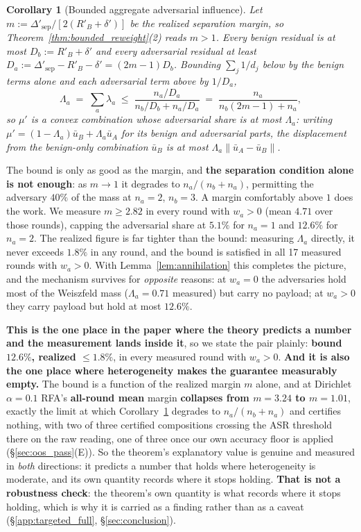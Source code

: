 \documentclass{article}
\newtheorem{corollary}{Corollary}
\begin{document}
\begin{corollary}[Bounded aggregate adversarial influence]
\label{cor:aggregate_mass}
Let $m := \Delta'_{\mathrm{sep}}/[2(R'_B+\delta')]$ be the realized separation margin, so Theorem~\ref{thm:bounded_reweight}(2) reads $m>1$. Every benign residual is at most $D_b := R'_B+\delta'$ and every adversarial residual at least $D_a := \Delta'_{\mathrm{sep}}-R'_B-\delta' = (2m-1)D_b$. Bounding $\sum_j 1/d_j$ below by the benign terms alone and each adversarial term above by $1/D_a$,
\[
\Lambda_a \;=\; \sum_{a}\lambda_a \;\leq\; \frac{n_a/D_a}{n_b/D_b + n_a/D_a} \;=\; \frac{n_a}{n_b(2m-1)+n_a},
\]
so $\mu'$ is a convex combination whose adversarial share is at most $\Lambda_a$: writing $\mu' = (1-\Lambda_a)\bar u_B + \Lambda_a \bar u_A$ for its benign and adversarial parts, the displacement from the benign-only combination $\bar u_B$ is at most $\Lambda_a\|\bar u_A - \bar u_B\|$.
\end{corollary}

\noindent The bound is only as good as the margin, and \textbf{the separation condition alone is not enough}: as $m\to1$ it degrades to $n_a/(n_b+n_a)$, permitting the adversary $40\%$ of the mass at $n_a{=}2$, $n_b{=}3$. A margin comfortably above $1$ does the work. We measure $m \geq 2.82$ in every round with $w_a>0$ (mean $4.71$ over those rounds), capping the adversarial share at $5.1\%$ for $n_a{=}1$ and $12.6\%$ for $n_a{=}2$. The realized figure is far tighter than the bound: measuring $\Lambda_a$ directly, it never exceeds $1.8\%$ in any round, and the bound is satisfied in all 17 measured rounds with $w_a>0$. With Lemma~\ref{lem:annihilation} this completes the picture, and the mechanism survives for \emph{opposite} reasons: at $w_a{=}0$ the adversaries hold most of the Weiszfeld mass ($\Lambda_a=0.71$ measured) but carry no payload; at $w_a>0$ they carry payload but hold at most $12.6\%$.

\noindent\textbf{This is the one place in the paper where the theory predicts a number and the measurement lands inside it}, so we state the pair plainly: \textbf{bound $12.6\%$, realized $\le 1.8\%$}, in every measured round with $w_a>0$. \textbf{And it is also the one place where heterogeneity makes the guarantee measurably empty.} The bound is a function of the realized margin $m$ alone, and at Dirichlet $\alpha{=}0.1$ RFA's \textbf{all-round mean} margin \textbf{collapses from $m{=}3.24$ to $m{=}1.01$}, exactly the limit at which Corollary~\ref{cor:aggregate_mass} degrades to $n_a/(n_b{+}n_a)$ and certifies nothing, with two of three certified compositions crossing the ASR threshold there on the raw reading, one of three once our own accuracy floor is applied (§\ref{sec:oos_pass}(E)). So the theorem's explanatory value is genuine and measured in \emph{both} directions: it predicts a number that holds where heterogeneity is moderate, and its own quantity records where it stops holding. \textbf{That is not a robustness check}: the theorem's own quantity is what records where it stops holding, which is why it is carried as a finding rather than as a caveat (§\ref{app:targeted_full}, §\ref{sec:conclusion}).
\end{document}
